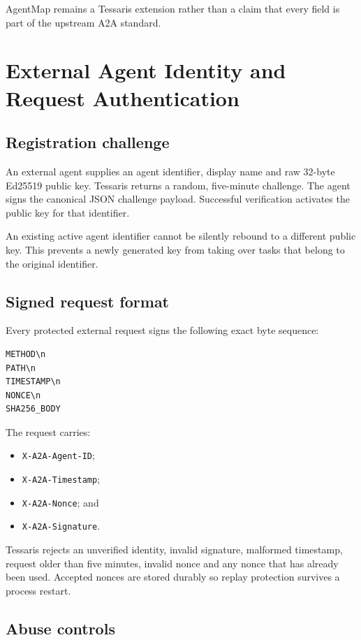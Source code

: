 \documentclass[11pt,a4paper]{article}
\newcommand{\code}[1]{\texttt{#1}}
\begin{document}
AgentMap remains a Tessaris extension rather than a claim that every field is
part of the upstream A2A standard.

\section{External Agent Identity and Request Authentication}

\subsection{Registration challenge}

An external agent supplies an agent identifier, display name and raw 32-byte
Ed25519 public key.  Tessaris returns a random, five-minute challenge.  The
agent signs the canonical JSON challenge payload.  Successful verification
activates the public key for that identifier.

An existing active agent identifier cannot be silently rebound to a different
public key.  This prevents a newly generated key from taking over tasks that
belong to the original identifier.

\subsection{Signed request format}

Every protected external request signs the following exact byte sequence:

\begin{lstlisting}[style=tessaris]
METHOD\n
PATH\n
TIMESTAMP\n
NONCE\n
SHA256_BODY
\end{lstlisting}

The request carries:

\begin{itemize}
  \item \code{X-A2A-Agent-ID};
  \item \code{X-A2A-Timestamp};
  \item \code{X-A2A-Nonce}; and
  \item \code{X-A2A-Signature}.
\end{itemize}

Tessaris rejects an unverified identity, invalid signature, malformed
timestamp, request older than five minutes, invalid nonce and any nonce that
has already been used.  Accepted nonces are stored durably so replay protection
survives a process restart.

\subsection{Abuse controls}
\end{document}
